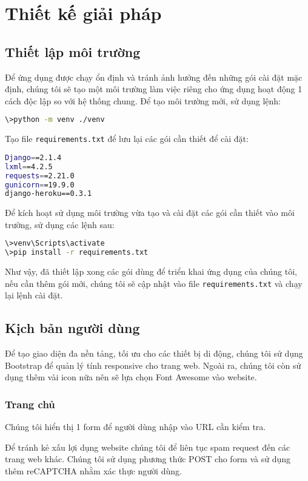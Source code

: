 \chapter{Thiết kế giải pháp}
\section{Thiết lập môi trường}
Để ứng dụng được chạy ổn định và tránh ảnh hưởng đến những gói cài đặt mặc định, chúng tôi sẽ tạo một môi trường làm việc riêng cho ứng dụng hoạt động 1 cách độc lập so với hệ thống chung. Để tạo môi trường mới, sử dụng lệnh:
\begin{lstlisting}[language=bash]
\>python -m venv ./venv
\end{lstlisting}
\par
Tạo file \texttt{requirements.txt} để lưu lại các gói cần thiết để cài đặt:
\begin{lstlisting}[language=bash]
Django==2.1.4
lxml==4.2.5
requests==2.21.0
gunicorn==19.9.0
django-heroku==0.3.1
\end{lstlisting}
\par
Để kích hoạt sử dụng môi trường vừa tạo và cài đặt các gói cần thiết vào môi trường, sử dụng các lệnh sau:
\begin{lstlisting}[language=bash]
\>venv\Scripts\activate
\>pip install -r requirements.txt
\end{lstlisting}
\par
Như vậy, đã thiết lập xong các gói dùng để triển khai ứng dụng của chúng tôi, nếu cần thêm gói mới, chúng tôi sẽ cập nhật vào file \texttt{requirements.txt} và chạy lại lệnh cài đặt.
\section{Kịch bản người dùng}
Để tạo giao diện đa nền tảng, tối ưu cho các thiết bị di động, chúng tôi sử dụng Bootstrap để quản lý tính responsive cho trang web. Ngoài ra, chúng tôi còn sử dụng thêm vài icon nữa nên sẽ lựa chọn Font Awesome vào website.
\subsection{Trang chủ}
Chúng tôi hiển thị 1 form để người dùng nhập vào URL cần kiểm tra.
\\\par
Để tránh kẻ xấu lợi dụng website chúng tôi để liên tục spam request đến các trang web khác. Chúng tôi sử dụng phương thức POST cho form và sử dụng thêm reCAPTCHA nhằm xác thực người dùng.
